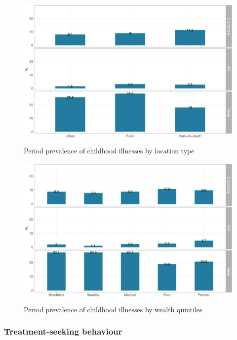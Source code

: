 \documentclass[12pt,a4paper]{article}
\begin{document}
\begin{figure}[H]

{\centering \includegraphics{kayinReport_files/figure-latex/ill1plot-1} 

}

\caption{Period prevalence of childhood illnesses by location type}\label{fig:ill1plot}
\end{figure}

\begin{figure}[H]

{\centering \includegraphics{kayinReport_files/figure-latex/ill2plot-1} 

}

\caption{Period prevalence of childhood illnesses by wealth quintiles}\label{fig:ill2plot}
\end{figure}

\hypertarget{ctreatment}{%
\subsubsection{Treatment-seeking behaviour}\label{ctreatment}}
\end{document}

